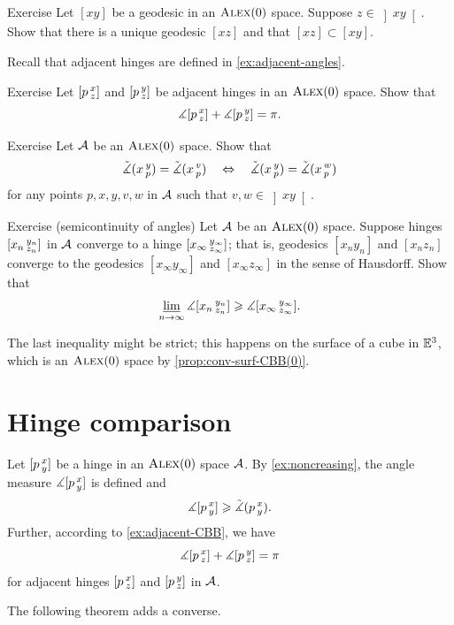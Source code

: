 \begin{thm}{Exercise}\label{ex:pi-angle}
Let $[xy]$ be a geodesic in an $\textup{\textsc{Alex}}(0)$ space.
Suppose $z\in \left]xy\right[$.
Show that there is a unique geodesic $[xz]$ and that $[xz]\subset [xy]$.
\end{thm}

Recall that adjacent hinges are defined in \ref{ex:adjacent-angles}.

\begin{thm}[!]{Exercise}\label{ex:adjacent-CBB}
Let $[p\,{}^{x}_{z}]$ and $[p\,{}^{y}_{z}]$ be adjacent hinges in an $\textup{\textsc{Alex}}(0)$ 
space.
Show that
\[\measuredangle[p\,{}^{x}_{z}]+\measuredangle[p\,{}^{y}_{z}]= \pi.\]
\end{thm}


\begin{thm}{Exercise}\label{ex:pxyvw}
Let $\mathcal{A}$ be an $\textup{\textsc{Alex}}(0)$ 
space.
Show that
\[
\tilde\measuredangle(x\,{}^{y}_{p})=\tilde\measuredangle(x\,{}^{v}_{p})
\quad\Leftrightarrow\quad
\tilde\measuredangle(x\,{}^{y}_{p})=\tilde\measuredangle(x\,{}^{w}_{p})
\]
for any points
$p,x,y,v,w$ in $\mathcal{A}$ such that $v,w\in \left]xy\right[$.
\end{thm}



\begin{thm}{Exercise (semicontinuity of angles)}\label{ex:angle-lim}
Let $\mathcal{A}$ be an $\textup{\textsc{Alex}}(0)$ space.
Suppose hinges $[x_n\,{}^{y_n}_{z_n}]$ in $\mathcal{A}$ converge to a hinge $[x_\infty\,{}^{y_\infty}_{z_\infty}]$;
that is, geodesics $[x_ny_n]$ and $[x_nz_n]$ converge to the geodesics $[x_\infty y_\infty]$ and $[x_\infty z_\infty]$ in the sense of Hausdorff.
Show that 
\[\varliminf_{n\to\infty}\measuredangle [x_n\,{}^{y_n}_{z_n}]\geqslant \measuredangle [x_\infty\,{}^{y_\infty}_{z_\infty}].\]
\end{thm}

The last inequality might be strict;
this happens on the surface of a cube in $\mathbb{E}^3$, which is an $\textup{\textsc{Alex}}(0)$ space by \ref{prop:conv-surf-CBB(0)}.

\section{Hinge comparison}

Let $[p\,{}^{x}_{y}]$ be a hinge in an $\textup{\textsc{Alex}}(0)$ space $\mathcal{A}$.
By \ref{ex:noncreasing}, the angle measure $\measuredangle[p\,{}^{x}_{y}]$ is defined and
\[\measuredangle[p\,{}^{x}_{y}]\geqslant \tilde\measuredangle(p\,{}^{x}_{y}).\]
Further, according to \ref{ex:adjacent-CBB}, we have 
\[\measuredangle[p\,{}^{x}_{z}]+\measuredangle[p\,{}^{y}_{z}]=\pi\]
for adjacent hinges $[p\,{}^{x}_{z}]$ and $[p\,{}^{y}_{z}]$ in $\mathcal{A}$.

The following theorem adds a converse.

